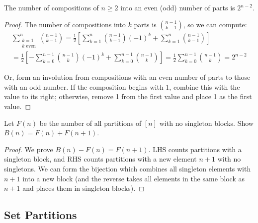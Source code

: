 \documentclass[a4paper]{article}
\begin{document}
\begin{theorem}
The number of compositions of $n\geq2$ into an even (odd) number of parts is $2^{n-2}$.

\begin{hl}
\begin{proof}
The number of compositions into $k$ parts is $\binom{n-1}{k-1}$, so we can compute:
\begin{multline*}
\sum_{\substack{k=1\\k\text{ even}}}^n\binom{n-1}{k-1}
=\frac12\left[\sum_{k=1}^n\binom{n-1}{k-1}(-1)^k+\sum_{k=1}^n\binom{n-1}{k-1}\right]\\
=\frac12\left[-\sum_{k=0}^{n-1}\binom{n-1}{k}(-1)^k+\sum_{k=0}^{n-1}\binom{n-1}{k}\right]
=\frac12\sum_{k=0}^{n-1}\binom{n-1}k=2^{n-2}
\end{multline*}

Or, form an involution from compositions with an even number of parts to those with an odd number. If the composition begins with 1, combine this with the value to its right; otherwise, remove 1 from the first value and place 1 as the first value.
\end{proof}
\end{hl}
\end{theorem}

\begin{example}
Let $F(n)$ be the number of all partitions of $[n]$ with no singleton blocks. Show $B(n)=F(n)+F(n+1)$.

\begin{hl}
\begin{proof}
We prove $B(n)-F(n)=F(n+1)$. LHS counts partitions with a singleton block, and RHS counts partitions with a new element $n+1$ with no singletons. We can form the bijection which combines all singleton elements with $n+1$ into a new block (and the reverse takes all elements in the same block as $n+1$ and places them in singleton blocks).
\end{proof}
\end{hl}
\end{example}

\subsection{Set Partitions}
\end{document}
